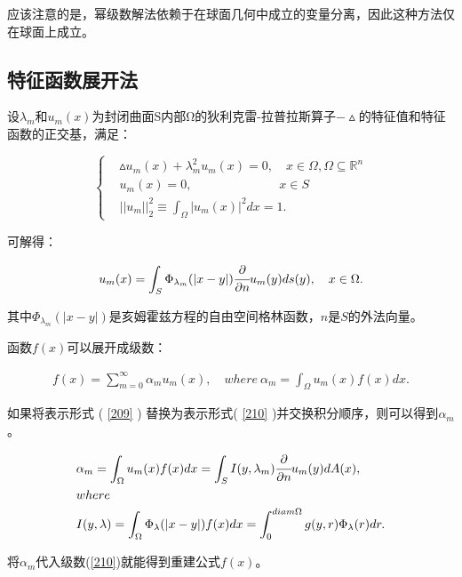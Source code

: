 应该注意的是，幂级数解法依赖于在球面几何中成立的变量分离，因此这种方法仅在球面上成立。


\subsection{特征函数展开法}

设$\lambda_m$和$u_m(x)$为封闭曲面S内部Ω的狄利克雷-拉普拉斯算子$−\vartriangle$的特征值和特征函数的正交基，满足：

\begin{equation} \label{208}
\left\{
\begin{aligned}
	& \vartriangle u_m(x)+\lambda_m^2u_m(x)=0,\quad x\in \Omega,\Omega\subseteq \mathbb{R}^n\\
	& u_m(x)=0,\quad \quad \quad \qquad \qquad x\in S\\
	& ||u_m||_2^2\equiv\int_{\Omega}|u_m(x)|^2dx=1.
\end{aligned}
\right.
\end{equation}

可解得：

\begin{equation} \label{209}
	\begin{aligned}
		u_m(x)=\int_{S}\Phi_{\lambda_m}(|x-y|)\cfrac{\partial}{\partial n}u_m(y)ds(y),\quad x\in\Omega.
	\end{aligned}
\end{equation}

其中$\Phi_{\lambda_m}(|x-y|)$是亥姆霍兹方程的自由空间格林函数，$n$是$S$的外法向量。

函数$f(x)$可以展开成级数：

\begin{equation} \label{210}
	\begin{aligned}
		f(x)=\sum_{m=0}^{\infty}\alpha_mu_m(x),\quad where\ \alpha_m=\int_{\Omega}u_m(x)f(x)dx.
	\end{aligned}
\end{equation}

如果将表示形式 ( \ref{209} ) 替换为表示形式( \ref{210} )并交换积分顺序，则可以得到$\alpha_m$。

\begin{equation} \label{211}
	\begin{aligned}
		& \alpha_m=\int_{\Omega}u_m(x)f(x)dx=\int_S I(y,\lambda_m)\cfrac{\partial}{\partial n}u_m(y)dA(x),\\
		& where\\
		& I(y,\lambda)=\int_{\Omega}\Phi_{\lambda}(|x-y|)f(x)dx=\int_0^{diam\Omega}g(y,r)\Phi_{\lambda}(r)dr.
	\end{aligned}
\end{equation}

将$\alpha_m$代入级数(\ref{210})就能得到重建公式$f(x)$。
